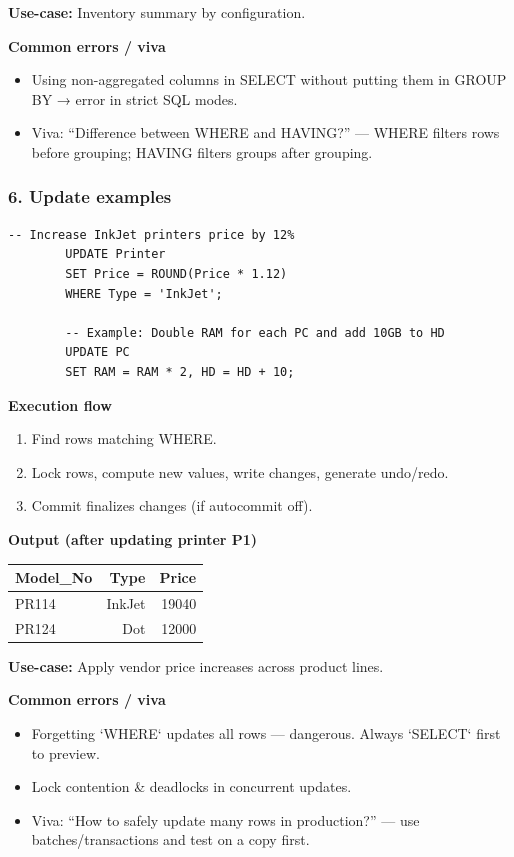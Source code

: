 \documentclass[11pt,a4paper]{article}
\begin{document}
	\textbf{Use-case:} Inventory summary by configuration.
	
	\textbf{Common errors / viva}
	\begin{itemize}[noitemsep]
		\item Using non-aggregated columns in SELECT without putting them in GROUP BY → error in strict SQL modes.  
		\item Viva: ``Difference between WHERE and HAVING?'' — WHERE filters rows before grouping; HAVING filters groups after grouping.
	\end{itemize}
	
	\bigskip
	\subsubsection*{6. Update examples}
	\begin{lstlisting}[caption={Safe updates and transformations}]
		-- Increase InkJet printers price by 12%
		UPDATE Printer
		SET Price = ROUND(Price * 1.12)
		WHERE Type = 'InkJet';
		
		-- Example: Double RAM for each PC and add 10GB to HD
		UPDATE PC
		SET RAM = RAM * 2, HD = HD + 10;
	\end{lstlisting}
	
	\textbf{Execution flow}
	\begin{enumerate}[noitemsep]
		\item Find rows matching WHERE.  
		\item Lock rows, compute new values, write changes, generate undo/redo.  
		\item Commit finalizes changes (if autocommit off).
	\end{enumerate}
	
	\textbf{Output (after updating printer P1)}
	\begin{center}
		\begin{tabular}{lrr}
			\toprule
			Model\_No & Type & Price \\
			\midrule
			PR114 & InkJet & 19040 \\
			PR124 & Dot   & 12000 \\
			\bottomrule
		\end{tabular}
	\end{center}
	
	\textbf{Use-case:} Apply vendor price increases across product lines.
	
	\textbf{Common errors / viva}
	\begin{itemize}[noitemsep]
		\item Forgetting `WHERE` updates all rows — dangerous. Always `SELECT` first to preview.  
		\item Lock contention & deadlocks in concurrent updates.  
		\item Viva: ``How to safely update many rows in production?'' — use batches/transactions and test on a copy first.
	\end{itemize}
	
\end{document}
